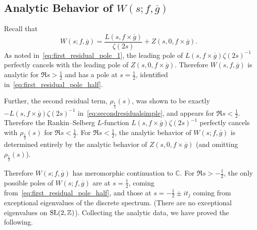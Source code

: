 \subsection{Analytic Behavior of $W(s; f, \overline{g})$}


Recall that
\begin{equation}
  W(s; f, \overline{g}) = \frac{L(s, f\times \overline{g})}{\zeta(2s)} + Z(s, 0, f\times \overline{g}).
\end{equation}
As noted in~\eqref{eq:first_residual_pole_1}, the leading pole of $L(s, f\times
\overline{g}) \zeta(2s)^{-1}$ perfectly cancels with the leading pole of $Z(s, 0, f\times
\overline{g})$.
Therefore $W(s, f, \overline{g})$ is analytic for $\Re s > \tfrac{1}{2}$ and has a pole at
$s = \tfrac{1}{2}$, identified in~\eqref{eq:first_residual_pole_half}.


Further, the second residual term, $\rho_{\frac{1}{2}}(s)$, was shown to be exactly $-L(s,
f\times \overline{g}) \zeta(2s)^{-1}$ in~\eqref{eq:secondresidualsimple}, and appears for
$\Re s < \frac{1}{2}$.
Therefore the Rankin--Selberg $L$-function %
$L(s, f\times \overline{g})\zeta(2s)^{-1}$ perfectly cancels with $\rho_{\frac{1}{2}}(s)$
for $\Re s < \frac{1}{2}$.
For $\Re s < \frac{1}{2}$, the analytic behavior of $W(s; f, \overline{g})$ is determined
entirely by the analytic behavior of $Z(s, 0, f\times \overline{g})$ (and omitting
$\rho_{\frac{1}{2}}(s)$).


Therefore $W(s; f, \overline{g})$ has meromorphic continuation to $\mathbb{C}$.
For $\Re s > - \tfrac{1}{2}$, the only possible poles of $W(s; f, \overline{g})$ are at $s
= \tfrac{1}{2}$, coming from~\eqref{eq:first_residual_pole_half}, and those at $s = -
\tfrac{1}{2} \pm it_j$ coming from exceptional eigenvalues of the discrete spectrum.
(There are no exceptional eigenvalues on $\operatorname{SL}(2, \mathbb{Z})$).
Collecting the analytic data, we have proved the following.



